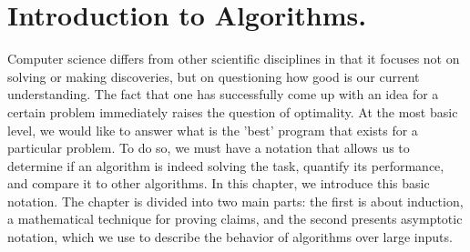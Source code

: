 



\newcommand*{\RECITATION}{}%
\newcommand*{\BOOK}{}%


\chapter{Introduction to Algorithms.}
\ifdefined\RECITATION
\else
Computer science differs from other scientific disciplines in that it focuses not on solving or making discoveries, but on questioning how good is our current understanding. The fact that one has successfully come up with an idea for a certain problem immediately raises the question of optimality. At the most basic level, we would like to answer what is the 'best'  program that exists for a particular problem. To do so, we must have a notation that allows us to determine if an algorithm is indeed solving the task, quantify its performance, and compare it to other algorithms. In this chapter, we introduce this basic notation. The chapter is divided into two main parts: the first is about induction, a mathematical technique for proving claims, and the second presents asymptotic notation, which we use to describe the behavior of algorithms over large inputs.
\fi
